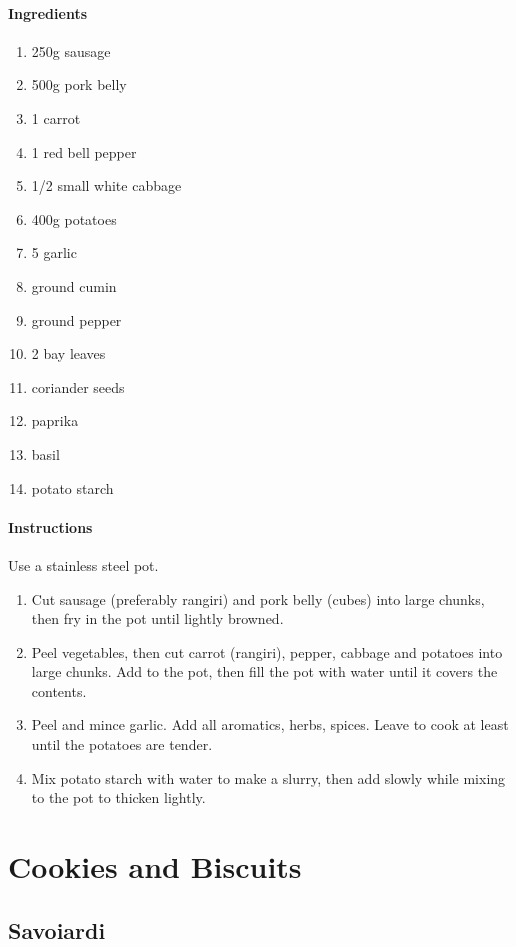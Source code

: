 \documentclass[11pt]{report}
\newcommand{\header}[1]{\subsubsection*{#1}}
\begin{document}
\header{Ingredients}
\begin{enumerate}
  \item 250g sausage
  \item 500g pork belly
  \item 1 carrot
  \item 1 red bell pepper
  \item 1/2 small white cabbage
  \item 400g potatoes
  \item 5 garlic
  \item ground cumin
  \item ground pepper
  \item 2 bay leaves
  \item coriander seeds
  \item paprika
  \item basil
  \item potato starch
\end{enumerate}

\header{Instructions}
Use a stainless steel pot.

\begin{enumerate}
  \item Cut sausage (preferably rangiri) and pork belly (cubes) into large
  chunks, then fry in the pot until lightly browned.
  \item Peel vegetables, then cut carrot (rangiri), pepper, cabbage and
  potatoes into large chunks. Add to the pot, then fill the pot with water
  until it covers the contents.
  \item Peel and mince garlic. Add all aromatics, herbs, spices. Leave to cook
  at least until the potatoes are tender.
  \item Mix potato starch with water to make a slurry, then add slowly while
  mixing to the pot to thicken lightly.
\end{enumerate}

\chapter{Cookies and Biscuits}

\section{Savoiardi \label{Savoiardi}}
\end{document}
